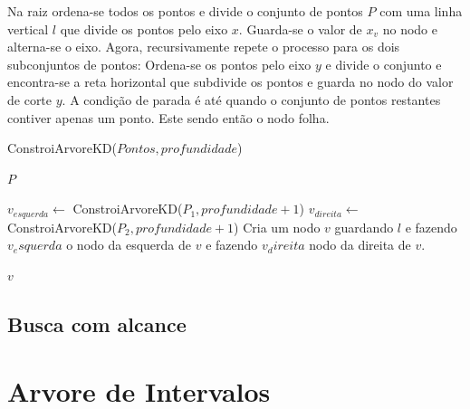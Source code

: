 Na raiz ordena-se todos os pontos e divide o conjunto de pontos \(P\) com uma linha vertical
\(l\) que divide os pontos pelo eixo \(x\). Guarda-se o valor de \(x_v\) no nodo e alterna-se o
eixo.
Agora, recursivamente repete o processo para os dois subconjuntos de pontos:
Ordena-se os pontos pelo eixo \(y\) e divide o conjunto e encontra-se a reta horizontal que
subdivide os pontos e guarda no nodo do valor de corte \(y\).
A condição de parada é até quando o conjunto de pontos restantes contiver apenas um ponto.
Este sendo então o nodo folha.


\begin{algorithm}
    \caption{ConstroiArvoreKD($Pontos, profundidade$)}
    \begin{algorithmic}
        \RETURN $P$
        \ELSE
        \ENDIF

        \STATE $v_{esquerda} \leftarrow $ ConstroiArvoreKD($P_1, profundidade+1$)
        \STATE $v_{direita} \leftarrow $ ConstroiArvoreKD($P_2, profundidade+1$)
        Cria um nodo $v$ guardando $l$ e fazendo $v_esquerda$ o nodo da esquerda
        de $v$ e fazendo $v_direita$ nodo da direita de $v$.

        \RETURN $v$
    \end{algorithmic}
\end{algorithm}


\subsection{Busca com alcance}

\section{Arvore de Intervalos}


